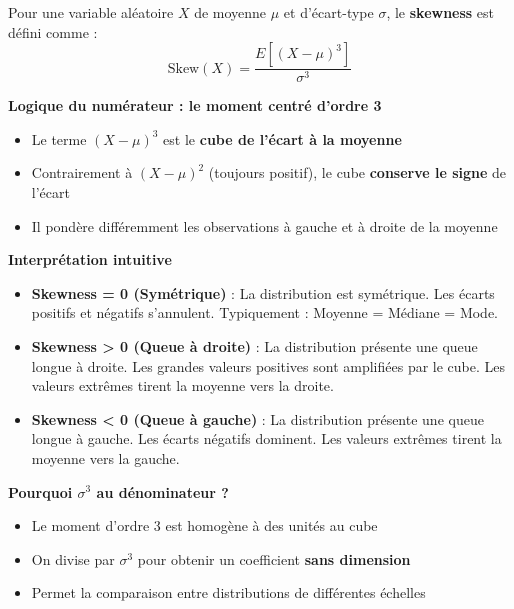 \begin{intuitionbox}
Pour une variable aléatoire $X$ de moyenne $\mu$ et d'écart-type $\sigma$, le \textbf{skewness} est défini comme :
\[
\text{Skew}(X) = \frac{E[(X - \mu)^3]}{\sigma^3}
\]

\medskip

\textbf{Logique du numérateur : le moment centré d'ordre 3}
\begin{itemize}
    \item Le terme $(X - \mu)^3$ est le \textbf{cube de l'écart à la moyenne}
    \item Contrairement à $(X - \mu)^2$ (toujours positif), le cube \textbf{conserve le signe} de l'écart
    \item Il pondère différemment les observations à gauche et à droite de la moyenne
\end{itemize}

\medskip

\textbf{Interprétation intuitive}
\begin{itemize}
    \item \textbf{Skewness = 0 (Symétrique)} : La distribution est symétrique. Les écarts positifs et négatifs s'annulent. Typiquement : Moyenne = Médiane = Mode.
    \item \textbf{Skewness > 0 (Queue à droite)} : La distribution présente une queue longue à droite. Les grandes valeurs positives sont amplifiées par le cube. Les valeurs extrêmes tirent la moyenne vers la droite.
    \item \textbf{Skewness < 0 (Queue à gauche)} : La distribution présente une queue longue à gauche. Les écarts négatifs dominent. Les valeurs extrêmes tirent la moyenne vers la gauche.
\end{itemize}

\medskip

\textbf{Pourquoi $\sigma^3$ au dénominateur ?}
\begin{itemize}
    \item Le moment d'ordre 3 est homogène à des unités au cube
    \item On divise par $\sigma^3$ pour obtenir un coefficient \textbf{sans dimension}
    \item Permet la comparaison entre distributions de différentes échelles
\end{itemize}
\end{intuitionbox}

